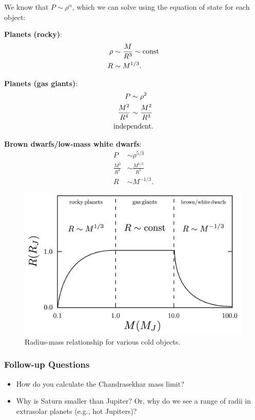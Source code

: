 \documentclass[a4paper,10pt]{article}
\begin{document}
{\noindent}We know that $P\sim\rho^\alpha$, which we can solve using the equation of state for each object:

{\noindent}\textbf{Planets (rocky)}:
\begin{align*}
    \rho &\sim \frac{M}{R^3} \sim {\rm const} \\
    R &\sim M^{1/3}.
\end{align*}

{\noindent}\textbf{Planets (gas giants)}:
\begin{align*}
    P &\sim \rho^2 \\
    \frac{M^2}{R^4} &\sim \frac{M^2}{R^3} \\
    {\rm indep}&{\rm endent}.
\end{align*}

{\noindent}\textbf{Brown dwarfs/low-mass white dwarfs}:
\begin{align*}
    P &\sim \rho^{5/3} \\
    \frac{M^2}{R^4} &\sim \frac{M^{5/3}}{R^5} \\
    R &\sim M^{-1/3}.
\end{align*}

\begin{figure}[h]
    \centering
    \includegraphics[width=12cm]{figures/RadiusMass.png}
    \caption{\footnotesize{Radius-mass relationship for various cold objects.}}
    \label{fig:radiusmass}
\end{figure}

\newpage
\subsubsection{Follow-up Questions}

\begin{itemize}
    \item How do you calculate the Chandrasekhar mass limit?
    \item Why is Saturn smaller than Jupiter? Or, why do we see a range of radii in extrasolar planets (e.g., hot Jupiters)?
\end{itemize}
\end{document}

